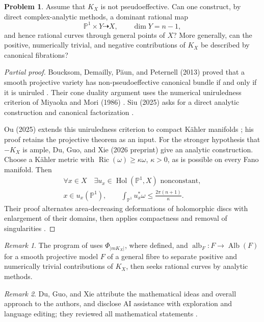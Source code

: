 \documentclass[11pt,reqno]{amsart}
\theoremstyle{definition}
\newtheorem{problem}{Problem}[section]
\theoremstyle{remark}
\newtheorem*{remark}{Remark}
\begin{document}
\begin{problem}\label{Siu-1.4}
Assume that $K_X$ is not pseudoeffective. Can one construct, by direct complex-analytic methods, a dominant rational map
\[
\mathbb P^1\times Y\dashrightarrow X,\qquad \dim Y=n-1,
\]
and hence rational curves through general points of $X$? More generally, can the positive, numerically trivial, and negative contributions of $K_X$ be described by canonical fibrations?
\end{problem}
\begin{proof}[Partial proof]
Boucksom, Demailly, P\u aun, and Peternell (2013) proved that a smooth projective variety has non-pseudoeffective canonical bundle if and only if it is uniruled \cite{SIU-BDPP13}. Their cone duality argument uses the numerical uniruledness criterion of Miyaoka and Mori (1986) \cite{SIU-MM86}. Siu (2025) asks for a direct analytic construction and canonical factorization \cite{Siu2025}.

Ou (2025) extends this uniruledness criterion to compact K\"ahler manifolds \cite[Theorem~1.1]{SIU-Ou25}; his proof retains the projective theorem as an input. For the stronger hypothesis that $-K_X$ is ample, Du, Guo, and Xie (2026 preprint) give an analytic construction. Choose a K\"ahler metric with $\operatorname{Ric}(\omega)\geq\kappa\omega$, $\kappa>0$, as is possible on every Fano manifold. Then
\[
\begin{gathered}
\forall x\in X\quad\exists u_x\in\operatorname{Hol}(\mathbb P^1,X)\text{ nonconstant},\\
x\in u_x(\mathbb P^1),\qquad
\int_{\mathbb P^1}u_x^*\omega\leq\frac{2\pi(n+1)}{\kappa}.
\end{gathered}
\]
Their proof alternates area-decreasing deformations of holomorphic discs with enlargement of their domains, then applies compactness and removal of singularities \cite[Theorem~1.2]{SIU-DGX26}.
\end{proof}
\begin{remark}
The program of \cite[\S1.4]{Siu2025} uses $\Phi_{|mK_X|}$, where defined, and $\operatorname{alb}_F:F\to\operatorname{Alb}(F)$ for a smooth projective model $F$ of a general fibre to separate positive and numerically trivial contributions of $K_X$, then seeks rational curves by analytic methods.
\end{remark}
\begin{remark}
Du, Guo, and Xie attribute the mathematical ideas and overall approach to the authors, and disclose AI assistance with exploration and language editing; they reviewed all mathematical statements \cite[AI use disclosure]{SIU-DGX26}.
\end{remark}
\end{document}
